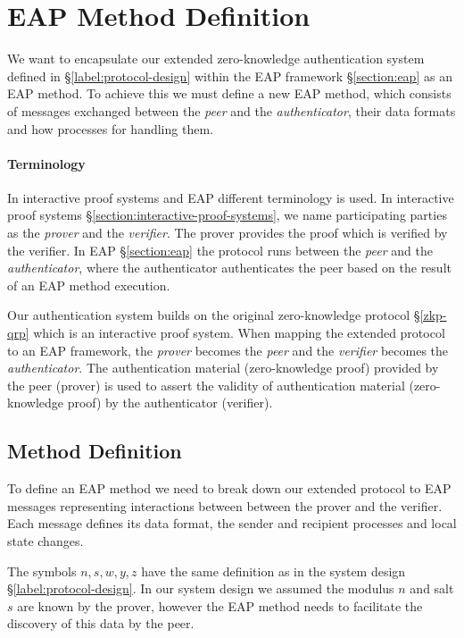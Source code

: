 \section{EAP Method Definition}
We want to encapsulate our extended zero-knowledge authentication system defined in \S\ref{label:protocol-design} within the EAP framework \S\ref{section:eap} as an EAP method.
To achieve this we must define a new EAP method, which consists of messages exchanged between the \textit{peer} and the \textit{authenticator}, their data formats and how processes for handling them.

\paragraph{Terminology}
In interactive proof systems and EAP different terminology is used.
In interactive proof systems \S\ref{section:interactive-proof-systems}, we name participating parties as the \textit{prover} and the \textit{verifier}. The prover provides the proof which is verified by the verifier.
In EAP \S\ref{section:eap} the protocol runs between the \textit{peer} and the \textit{authenticator}, where the authenticator authenticates the peer based on the result of an EAP method execution.

Our authentication system builds on the original zero-knowledge protocol \S\ref{zkp-qrp} which is an interactive proof system. 
When mapping the extended protocol to an EAP framework, the \textit{prover} becomes the \textit{peer} and the \textit{verifier} becomes the \textit{authenticator}.
The authentication material (zero-knowledge proof) provided by the peer (prover) is used to assert the validity of authentication material (zero-knowledge proof) by the authenticator (verifier).

\subsection{Method Definition}

To define an EAP method we need to break down our extended protocol to EAP messages representing interactions between between the prover and the verifier.
Each message defines its data format, the sender and recipient processes and local state changes.

The symbols $n, s, w, y, z$ have the same definition as in the system design \S\ref{label:protocol-design}.
In our system design we assumed the modulus $n$ and salt $s$ are known by the prover, however the EAP method needs to facilitate the discovery of this data by the peer.

